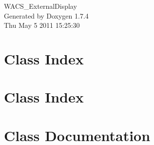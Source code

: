 \documentclass[a4paper]{book}
\begin{document}
\hypersetup{pageanchor=false}
\begin{titlepage}
\vspace*{7cm}
\begin{center}
{\Large WACS\_\-ExternalDisplay }\\
\vspace*{1cm}
{\large Generated by Doxygen 1.7.4}\\
\vspace*{0.5cm}
{\small Thu May 5 2011 15:25:30}\\
\end{center}
\end{titlepage}
\clearemptydoublepage
{}
\tableofcontents
\clearemptydoublepage
{}
\hypersetup{pageanchor=true}
\chapter{Class Index}

\chapter{Class Index}

\chapter{Class Documentation}







































\printindex
\end{document}
